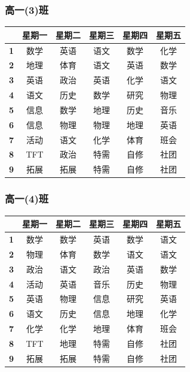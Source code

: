 \documentclass[a4paper]{article}
\begin{document}
  \subsubsection{高一(3)班}
   \begin{tabular}{|c|c|c|c|c|c|}
   \hline
   & \bf 星期一 & \bf 星期二 & \bf 星期三 & \bf 星期四 & \bf 星期五 \\\hline
   \bf 1 & 数学 & 英语 & 语文 & 数学 & 化学 \\\hline
   \bf 2 & 地理 & 体育 & 语文 & 英语 & 数学 \\\hline
   \bf 3 & 英语 & 政治 & 英语 & 化学 & 语文 \\\hline
   \bf 4 & 语文 & 历史 & 数学 & 研究 & 物理 \\\hline
   \bf 5 & 信息 & 数学 & 地理 & 历史 & 音乐 \\\hline
   \bf 6 & 信息 & 物理 & 物理 & 地理 & 英语 \\\hline
   \bf 7 & 活动 & 语文 & 化学 & 体育 & 班会 \\\hline
   \bf 8 & TFT  & 政治 & 特需 & 自修 & 社团 \\\hline
   \bf 9 & 拓展 & 拓展 & 特需 & 自修 & 社团 \\\hline
   \end{tabular}
  \clearpage
  \subsubsection{高一(4)班}
   \begin{tabular}{|c|c|c|c|c|c|}
   \hline
   & \bf 星期一 & \bf 星期二 & \bf 星期三 & \bf 星期四 & \bf 星期五 \\\hline
   \bf 1 & 数学 & 数学 & 英语 & 数学 & 语文 \\\hline
   \bf 2 & 物理 & 体育 & 数学 & 语文 & 语文 \\\hline
   \bf 3 & 政治 & 语文 & 政治 & 英语 & 数学 \\\hline
   \bf 4 & 活动 & 英语 & 音乐 & 历史 & 物理 \\\hline
   \bf 5 & 英语 & 物理 & 信息 & 研究 & 英语 \\\hline
   \bf 6 & 语文 & 历史 & 信息 & 地理 & 化学 \\\hline
   \bf 7 & 化学 & 化学 & 地理 & 体育 & 班会 \\\hline
   \bf 8 & TFT  & 地理 & 特需 & 自修 & 社团 \\\hline
   \bf 9 & 拓展 & 拓展 & 特需 & 自修 & 社团 \\\hline
   \end{tabular}
\end{document}
